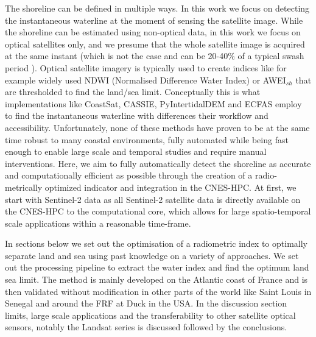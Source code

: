 \documentclass[remotesensing,article,submit,pdftex,moreauthors]{Definitions/mdpi}
\begin{document}
The shoreline can be defined in multiple ways. In this work we focus on detecting the instantaneous waterline at the moment of sensing the satellite image. While the shoreline can be estimated using non-optical data, in this work we focus on optical satellites only, and we presume that the whole satellite image is acquired at the same instant (which is not the case and can be 20-40\% of a typical swash period \citep{binet2022accurate}). Optical satellite imagery is typically used to create indices like for example widely used NDWI (Normalised Difference Water Index) or AWEI$_{sh}$ that are thresholded to find the land/sea limit. Conceptually this is what implementations like CoastSat, CASSIE, PyIntertidalDEM and ECFAS employ to find the instantaneous waterline with differences their workflow and accessibility. Unfortunately, none of these methods have proven to be at the same time robust to many coastal environments, fully automated while being fast enough to enable large scale and temporal studies and require manual interventions. Here, we aim to fully automatically detect the shoreline as accurate and computationally efficient as possible through the creation of a radio-metrically optimized indicator and integration in the CNES-HPC. At first, we start with Sentinel-2 data as all Sentinel-2 satellite data is directly available on the CNES-HPC to the computational core, which allows for large spatio-temporal scale applications within a reasonable time-frame.

In sections below we set out the optimisation of a radiometric index to optimally separate land and sea using past knowledge on a variety of approaches. We set out the processing pipeline to extract the water index and find the optimum land sea limit. The method is mainly developed on the Atlantic coast of France and is then validated without modification in other parts of the world like Saint Louis in Senegal and around the FRF at Duck in the USA. In the discussion section limits, large scale applications and the transferability to other satellite optical sensors, notably the Landsat series is discussed followed by the conclusions.

\end{document}
